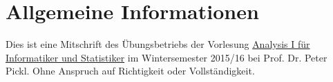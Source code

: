 \chapter*{Allgemeine Informationen}
Dies ist eine Mitschrift des Übungsbetriebs der Vorlesung
\href{http://www.mathematik.uni-muenchen.de/~nissen/analysis2015/}{Analysis I für Informatiker und Statistiker}
im Wintersemester 2015/16 bei Prof. Dr. Peter Pickl. Ohne Anspruch auf Richtigkeit oder Vollständigkeit.
